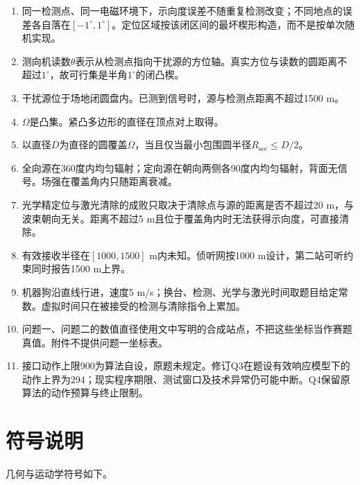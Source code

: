 \documentclass{cumcmthesis}
\begin{document}
\begin{enumerate}
\item 同一检测点、同一电磁环境下，示向度误差不随重复检测改变；不同地点的误差各自落在$[-1^\circ,1^\circ]$。定位区域按该闭区间的最坏楔形构造，而不是按单次随机实现。
\item 测向机读数$\theta$表示从检测点指向干扰源的方位轴。真实方位与读数的圆距离不超过$1^\circ$，故可行集是半角$1^\circ$的闭凸楔。
\item 干扰源位于场地闭圆盘内。已测到信号时，源与检测点距离不超过1500 m。
\item $\Omega$是凸集。紧凸多边形的直径在顶点对上取得。
\item 以直径$D$为直径的圆覆盖$\Omega$，当且仅当最小包围圆半径$R_{\mathrm{sec}}\le D/2$。
\item 全向源在360度内均匀辐射；定向源在朝向两侧各90度内均匀辐射，背面无信号。场强在覆盖角内只随距离衰减。
\item 光学精定位与激光清除的成败只取决于清除点与源的距离是否不超过20 m，与波束朝向无关。距离不超过5 m且位于覆盖角内时无法获得示向度，可直接清除。
\item 有效接收半径在$[1000,1500]$ m内未知。侦听网按1000 m设计，第二站可听约束同时报告1500 m上界。
\item 机器狗沿直线行进，速度5 m/s；换台、检测、光学与激光时间取题目给定常数。虚拟时间只在被接受的检测与清除指令上累加。
\item 问题一、问题二的数值直径使用文中写明的合成站点，不把这些坐标当作赛题真值。附件不提供问题一坐标表。
\item 接口动作上限900为算法自设，原题未规定。修订Q3在题设有效响应模型下的动作上界为294；现实程序期限、测试窗口及技术异常仍可能中断。Q4保留原算法的动作预算与终止限制。
\end{enumerate}

\clearpage
\section{符号说明}

几何与运动学符号如下。
\end{document}
